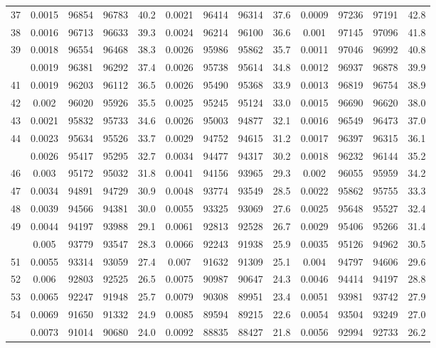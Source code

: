 \documentclass[
  14pt,
]{article}
\begin{document}
\begin{longtable}[t]{lcccccccccccc}
37 & 0.0015 & 96854 & 96783 & 40.2 & 0.0021 & 96414 & 96314 & 37.6 & 0.0009 & 97236 & 97191 & 42.8\\
38 & 0.0016 & 96713 & 96633 & 39.3 & 0.0024 & 96214 & 96100 & 36.6 & 0.001 & 97145 & 97096 & 41.8\\
39 & 0.0018 & 96554 & 96468 & 38.3 & 0.0026 & 95986 & 95862 & 35.7 & 0.0011 & 97046 & 96992 & 40.8\\
\addlinespace
40 & 0.0019 & 96381 & 96292 & 37.4 & 0.0026 & 95738 & 95614 & 34.8 & 0.0012 & 96937 & 96878 & 39.9\\
41 & 0.0019 & 96203 & 96112 & 36.5 & 0.0026 & 95490 & 95368 & 33.9 & 0.0013 & 96819 & 96754 & 38.9\\
42 & 0.002 & 96020 & 95926 & 35.5 & 0.0025 & 95245 & 95124 & 33.0 & 0.0015 & 96690 & 96620 & 38.0\\
43 & 0.0021 & 95832 & 95733 & 34.6 & 0.0026 & 95003 & 94877 & 32.1 & 0.0016 & 96549 & 96473 & 37.0\\
44 & 0.0023 & 95634 & 95526 & 33.7 & 0.0029 & 94752 & 94615 & 31.2 & 0.0017 & 96397 & 96315 & 36.1\\
\addlinespace
45 & 0.0026 & 95417 & 95295 & 32.7 & 0.0034 & 94477 & 94317 & 30.2 & 0.0018 & 96232 & 96144 & 35.2\\
46 & 0.003 & 95172 & 95032 & 31.8 & 0.0041 & 94156 & 93965 & 29.3 & 0.002 & 96055 & 95959 & 34.2\\
47 & 0.0034 & 94891 & 94729 & 30.9 & 0.0048 & 93774 & 93549 & 28.5 & 0.0022 & 95862 & 95755 & 33.3\\
48 & 0.0039 & 94566 & 94381 & 30.0 & 0.0055 & 93325 & 93069 & 27.6 & 0.0025 & 95648 & 95527 & 32.4\\
49 & 0.0044 & 94197 & 93988 & 29.1 & 0.0061 & 92813 & 92528 & 26.7 & 0.0029 & 95406 & 95266 & 31.4\\
\addlinespace
50 & 0.005 & 93779 & 93547 & 28.3 & 0.0066 & 92243 & 91938 & 25.9 & 0.0035 & 95126 & 94962 & 30.5\\
51 & 0.0055 & 93314 & 93059 & 27.4 & 0.007 & 91632 & 91309 & 25.1 & 0.004 & 94797 & 94606 & 29.6\\
52 & 0.006 & 92803 & 92525 & 26.5 & 0.0075 & 90987 & 90647 & 24.3 & 0.0046 & 94414 & 94197 & 28.8\\
53 & 0.0065 & 92247 & 91948 & 25.7 & 0.0079 & 90308 & 89951 & 23.4 & 0.0051 & 93981 & 93742 & 27.9\\
54 & 0.0069 & 91650 & 91332 & 24.9 & 0.0085 & 89594 & 89215 & 22.6 & 0.0054 & 93504 & 93249 & 27.0\\
\addlinespace
55 & 0.0073 & 91014 & 90680 & 24.0 & 0.0092 & 88835 & 88427 & 21.8 & 0.0056 & 92994 & 92733 & 26.2\\

\end{longtable}
\end{document}
